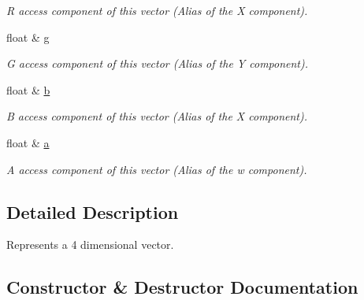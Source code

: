 \begin{DoxyCompactItemize}
\begin{DoxyCompactList}\small\item\em R access component of this vector (Alias of the X component). \end{DoxyCompactList}\item 
\hypertarget{classchaos_1_1gfx_1_1_vector4_ac67f5b9a42563f296a785cfabed59931}{}float \& \hyperlink{classchaos_1_1gfx_1_1_vector4_ac67f5b9a42563f296a785cfabed59931}{g}\label{classchaos_1_1gfx_1_1_vector4_ac67f5b9a42563f296a785cfabed59931}

\begin{DoxyCompactList}\small\item\em G access component of this vector (Alias of the Y component). \end{DoxyCompactList}\item 
\hypertarget{classchaos_1_1gfx_1_1_vector4_aa10471892589c24c187c0d06219a2c7b}{}float \& \hyperlink{classchaos_1_1gfx_1_1_vector4_aa10471892589c24c187c0d06219a2c7b}{b}\label{classchaos_1_1gfx_1_1_vector4_aa10471892589c24c187c0d06219a2c7b}

\begin{DoxyCompactList}\small\item\em B access component of this vector (Alias of the X component). \end{DoxyCompactList}\item 
\hypertarget{classchaos_1_1gfx_1_1_vector4_af48266de72984e7486795b882a59fea7}{}float \& \hyperlink{classchaos_1_1gfx_1_1_vector4_af48266de72984e7486795b882a59fea7}{a}\label{classchaos_1_1gfx_1_1_vector4_af48266de72984e7486795b882a59fea7}

\begin{DoxyCompactList}\small\item\em A access component of this vector (Alias of the w component). \end{DoxyCompactList}\end{DoxyCompactItemize}


\subsection{Detailed Description}
Represents a 4 dimensional vector. 

\subsection{Constructor \& Destructor Documentation}
\hypertarget{classchaos_1_1gfx_1_1_vector4_abdee87e0c5bbd7a9870957951f2bba80}{}
